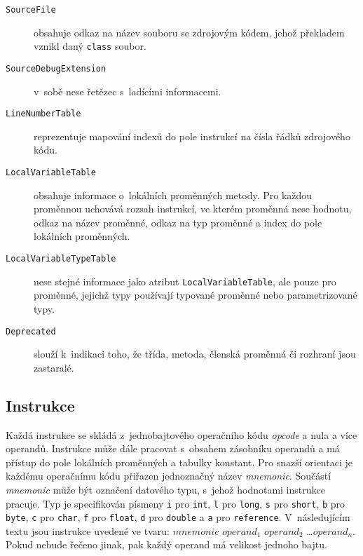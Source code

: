 \begin{description}

\item [\texttt{SourceFile}] obsahuje odkaz na název souboru se zdrojovým kódem, jehož překladem vznikl daný \texttt{class} soubor.

\item [\texttt{SourceDebugExtension}] v~sobě nese řetězec s~ladícími informacemi.

\item [\texttt{LineNumberTable}] reprezentuje mapování indexů do pole instrukcí na čísla řádků zdrojového kódu.

\item [\texttt{LocalVariableTable}] obsahuje informace o~lokálních proměnných metody. Pro každou proměnnou uchovává rozsah instrukcí, ve kterém proměnná nese hodnotu, odkaz na název proměnné, odkaz na typ proměnné a index do pole lokálních proměnných.

\item [\texttt{LocalVariableTypeTable}] nese stejné informace jako atribut \texttt{LocalVariableTable}, ale pouze pro proměnné, jejichž typy používají typované proměnné nebo parametrizované typy. 

\item [\texttt{Deprecated}] slouží k~indikaci toho, že třída, metoda, členská proměnná či rozhraní jsou zastaralé.

\end{description}

\subsection{Instrukce}\label{FormatInstruction}

Každá instrukce se skládá z~jednobajtového operačního kódu \textit{opcode} a nula a více operandů. Instrukce může dále pracovat s~obsahem zásobníku operandů a má přístup do pole lokálních proměnných a tabulky konstant. Pro snazší orientaci je každému operačnímu kódu přiřazen jednoznačný název \textit{mnemonic}. Součástí \textit{mnemonic} může být označení datového typu, s~jehož hodnotami instrukce pracuje. Typ je specifikován písmeny \texttt{i} pro \texttt{int}, \texttt{l} pro \texttt{long}, \texttt{s} pro \texttt{short}, \texttt{b} pro \texttt{byte}, \texttt{c} pro \texttt{char}, \texttt{f} pro \texttt{float}, \texttt{d} pro \texttt{double} a \texttt{a} pro \texttt{reference}. V~následujícím textu jsou instrukce uvedené ve tvaru: $mnemonic$ $operand_1$ $operand_2$ \dots $operand_n$. Pokud nebude řečeno jinak, pak každý operand má velikost jednoho bajtu.

